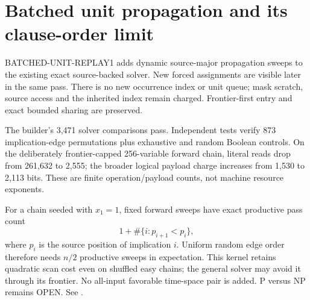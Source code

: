 \section{Batched unit propagation and its clause-order limit}
BATCHED-UNIT-REPLAY1 adds dynamic source-major propagation sweeps to the
existing exact source-backed solver. New forced assignments are visible
later in the same pass. There is no new occurrence index or unit queue;
mask scratch, source access and the inherited index remain charged.
Frontier-first entry and exact bounded sharing are preserved.

The builder's 3,471 solver comparisons pass. Independent tests verify
873 implication-edge permutations plus exhaustive and random Boolean
controls. On the deliberately frontier-capped 256-variable forward
chain, literal reads drop from 261,632 to 2,555; the broader logical
payload charge increases from 1,530 to 2,113 bits.
These are finite operation/payload counts, not machine resource exponents.

For a chain seeded with $x_1=1$, fixed forward sweeps have exact productive
pass count
\[
1+\#\{i:p_{i+1}<p_i\},
\]
where $p_i$ is the source position of implication $i$.
Uniform random edge order therefore needs $n/2$ productive sweeps in
expectation. This kernel retains quadratic scan cost even on shuffled
easy chains; the general solver may avoid it through its frontier.
No all-input favorable time-space pair is added. P versus NP remains OPEN.
See .
